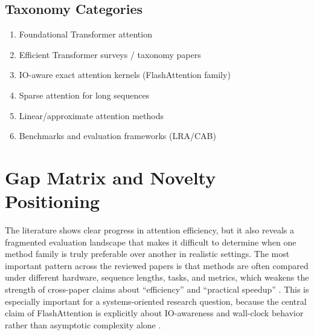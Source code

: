 \documentclass[12pt, a4paper]{article}
\begin{document}
\subsection{Taxonomy Categories}

\begin{enumerate}
    \item Foundational Transformer attention
    \item Efficient Transformer surveys / taxonomy papers
    \item IO-aware exact attention kernels (FlashAttention family)
    \item Sparse attention for long sequences
    \item Linear/approximate attention methods
    \item Benchmarks and evaluation frameworks (LRA/CAB)
\end{enumerate}


\section{Gap Matrix and Novelty Positioning}

The literature shows clear progress in attention efficiency, but it also reveals a fragmented evaluation landscape that makes it difficult to determine when one method family is truly preferable over another in realistic settings. The most important pattern across the reviewed papers is that methods are often compared under different hardware, sequence lengths, tasks, and metrics, which weakens the strength of cross-paper claims about ``efficiency'' and ``practical speedup'' \parencite{tay2020longrangearenabenchmark, zhang2025cabcomprehensiveattentionbenchmarking}. This is especially important for a systems-oriented research question, because the central claim of FlashAttention is explicitly about IO-awareness and wall-clock behavior rather than asymptotic complexity alone \parencite{dao2022flashattentionfastmemoryefficientexact}.
\end{document}
